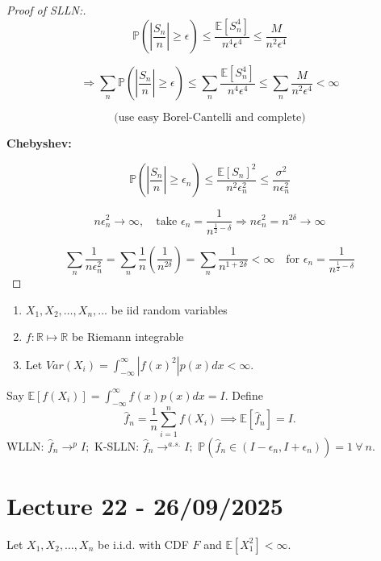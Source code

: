 \documentclass{article}
\newcommand{\1}{\mathds{1}}
\newcommand{\R}{\mathbb{R}}
\newcommand{\E}{\mathbb{E}}
\newcommand{\PB}{\mathbb{P}}
\newcommand{\lf}{\left}
\newcommand{\rg}{\right}
\newcommand{\f}[2]{\frac{#1}{#2}}
\newcommand{\card}[1]{\lf\vert #1\rg\vert}
\begin{document}
\begin{proof}[Proof of SLLN:]
\[
    \mathbb{P}\left( \left| \frac{S_n}{n} \right| \geq \epsilon \right) 
\leq \frac{\mathbb{E}[S_n^4]}{n^4 \epsilon^4} \leq \frac{M}{n^2 \epsilon^4}
\]

\[
\Rightarrow \sum_n \mathbb{P}\left( \left| \frac{S_n}{n} \right| \geq \epsilon \right)
\leq \sum_n \frac{\mathbb{E}[S_n^4]}{n^4 \epsilon^4} \leq \sum_n \frac{M}{n^2 \epsilon^4} < \infty
\]

\[
\text{(use easy Borel-Cantelli and complete)}
\]

\textbf{Chebyshev:}

\[
\mathbb{P} \left( \left| \frac{S_n}{n} \right| \geq \epsilon_n \right)
\leq \frac{\mathbb{E}[S_n]^2}{n^2 \epsilon_n^2} \leq \frac{\sigma^2}{n \epsilon_n^2}
\]

\[
n \epsilon_n^2 \to \infty, \quad \text{take } \epsilon_n = \frac{1}{n^{\frac{1}{2} - \delta}} 
\Rightarrow n \epsilon_n^2 = n^{2\delta} \to \infty
\]

\[
\sum_n \frac{1}{n \epsilon_n^2} 
= \sum_n \frac{1}{n} \left( \frac{1}{n^{2\delta}} \right) 
= \sum_n \frac{1}{n^{1 + 2\delta}} < \infty 
\quad \text{for } \epsilon_n = \frac{1}{n^{\frac{1}{2} - \delta}}
\]
\end{proof}
\begin{enumerate}
    \item $X_1,X_2,\ldots,X_n,\ldots$ be iid random variables
    \item $f:\R\mapsto\R$ be Riemann integrable
    \item Let $Var(X_i)=\int_{-\infty}^\infty \card{f(x)^2}p(x)dx<\infty.$
\end{enumerate}
Say $\E[f(X_i)]=\int_{-\infty}^\infty f(x)p(x)dx=I.$ Define $$\hat f_n=\f 1n\sum_{i=1}^n f(X_i)\implies\E[\hat f_n]=I.$$
WLLN: $\hat f_n\to^p I;$ K-SLLN: $\hat f_n\to^{a.s.} I;$ 
$\PB(\hat f_n\in (I-\epsilon_n,I+\epsilon_n))=1\ \forall\ n.$
\section{Lecture 22 - 26/09/2025}
Let \( X_1, X_2, \ldots, X_n \) be i.i.d. with CDF \( F \) and \( \mathbb{E}[X_1^2] < \infty \).
\end{document}
